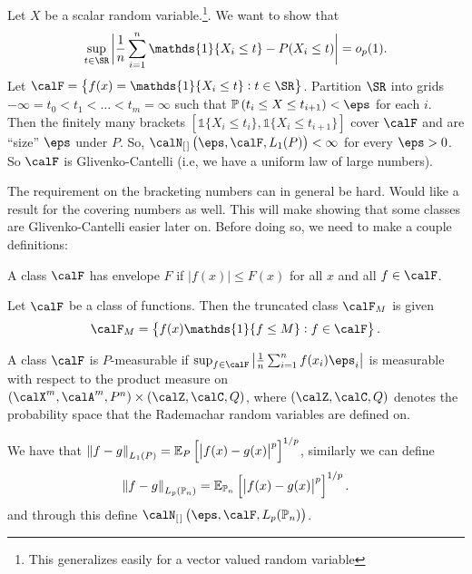 \begin{example*}
	Let \(X\) be a scalar random variable.\footnote{This generalizes easily for a vector valued random variable}. We want to show that 
	\[
		\sup_{t\in\SR}\bigg| \frac{1}{n}\sum_{i=1}^n \mathds{1}\{X_i\leq t\}-P(X_i\leq t)\bigg|=o_p(1)
	.\]
	Let \(\calF = \left\{f(x)=\mathds{1}\{X_i\leq t\}: t \in \SR\right\}\). Partition \(\SR\) into grids  \(-\infty = t_0 < t_1 < \dots< t_m = \infty\) such that \(\P\left(t_i \leq X \leq t_{i+1}\right)<\eps\) for each \(i\). Then the finitely many brackets \(\left[\mathds{1}\{X_i \leq t_i\},\mathds{1}\{X_i \leq t_{i+1}\}\right]\) cover \(\calF\) and are ``size'' \(\eps\) under \(P\). So, \(\calN_{[\hspace{0.1em}]}\left(\eps,\calF,L_1(P)\right)<\infty\) for every \(\eps>0\). So \(\calF\) is Glivenko-Cantelli (i.e, we have a uniform law of large numbers).
\end{example*}
The requirement on the bracketing numbers can in general be hard. Would like a result for the covering numbers as well. This will make showing that some classes are Glivenko-Cantelli easier later on. Before doing so, we need to make a couple definitions:
\begin{definition}[Envelope]
	\label{def:envelope}
	A class \(\calF\) has envelope \(F\) if \(|f(x)|\leq F(x)\) for all \(x\) and all \(f\in\calF\).
\end{definition}
\begin{definition}
	\label{def:truncated-class}
	Let \(\calF\) be a class of functions. Then the truncated class \(\calF_M\) is given 
	\[
		\calF_M = \left\{f(x)\mathds{1}\{f \leq M\}: f\in\calF\right\}	
	.\]
\end{definition}
\begin{definition}
	\label{def:p-measurable-class}
	A class \(\calF\) is \(P\)-measurable if \(\sup_{f\in\calF}\left|\frac{1}{n}\sum_{i=1}^n f(x_i)\eps_i\right|\) is measurable with respect to the product measure on \((\calX^m,\calA^m,P^n)\times(\calZ,\calC,Q)\), where \((\calZ,\calC,Q)\) denotes the probability space that the Rademachar random variables are defined on.
\end{definition}
\begin{definition}[\(L_p(\P_n)\)-norm]
	\label{def:lpn-norm}
	We have that \(\left\|f-g\right\|_{L_1(P)} = \mathbb{E}_P\left[\left|f(x)-g(x)\right|^p\right]^{1/p}\), similarly we can define 
	\[
		\left\|f-g\right\|_{L_p(\mathbb{P}_n)} = \mathbb{E}_{\mathbb{P}_n}\left[\left|f(x)-g(x)\right|^p\right]^{1/p}
	.\]
	and through this define \(\calN_{[\hspace{0.1em}]}\left(\eps,\calF,L_p(\P_n)\right)\). 
\end{definition}

